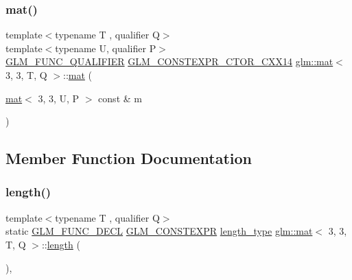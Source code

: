 \mbox{\label{structglm_1_1mat_3_013_00_013_00_01_t_00_01_q_01_4_ad2ae09a7a8a55aa735691eaf3dad3e0f}} 
\subsubsection{\texorpdfstring{mat()}{mat()}\hspace{0.1cm}{\footnotesize\ttfamily [21/21]}}
{\footnotesize\ttfamily template$<$typename T , qualifier Q$>$ \\
template$<$typename U, qualifier P$>$ \\
\hyperlink{setup_8hpp_a33fdea6f91c5f834105f7415e2a64407}{G\+L\+M\+\_\+\+F\+U\+N\+C\+\_\+\+Q\+U\+A\+L\+I\+F\+I\+ER} \hyperlink{setup_8hpp_a0900f9145e68bf6061b6f5e7be3fa751}{G\+L\+M\+\_\+\+C\+O\+N\+S\+T\+E\+X\+P\+R\+\_\+\+C\+T\+O\+R\+\_\+\+C\+X\+X14} \hyperlink{structglm_1_1mat}{glm\+::mat}$<$ 3, 3, T, Q $>$\+::\hyperlink{structglm_1_1mat}{mat} (\begin{DoxyParamCaption}\item[{\hyperlink{structglm_1_1mat}{mat}$<$ 3, 3, U, P $>$ const \&}]{m }\end{DoxyParamCaption})}



\subsection{Member Function Documentation}
\mbox{\label{structglm_1_1mat_3_013_00_013_00_01_t_00_01_q_01_4_aa0e0966b5046ab9a88536683a901c589}} 
\subsubsection{\texorpdfstring{length()}{length()}}
{\footnotesize\ttfamily template$<$typename T , qualifier Q$>$ \\
static \hyperlink{setup_8hpp_ab2d052de21a70539923e9bcbf6e83a51}{G\+L\+M\+\_\+\+F\+U\+N\+C\+\_\+\+D\+E\+CL} \hyperlink{setup_8hpp_a08b807947b47031d3a511f03f89645ad}{G\+L\+M\+\_\+\+C\+O\+N\+S\+T\+E\+X\+PR} \hyperlink{structglm_1_1mat_3_013_00_013_00_01_t_00_01_q_01_4_ae1b8524f20936516a48384a2841b5b9d}{length\+\_\+type} \hyperlink{structglm_1_1mat}{glm\+::mat}$<$ 3, 3, T, Q $>$\+::\hyperlink{_s_d_l__opengl__glext_8h_ab9c919755bde3b34349e23a32b4e0fa7}{length} (\begin{DoxyParamCaption}{ }\end{DoxyParamCaption})\hspace{0.3cm}{\ttfamily [inline]}, {\ttfamily [static]}}

